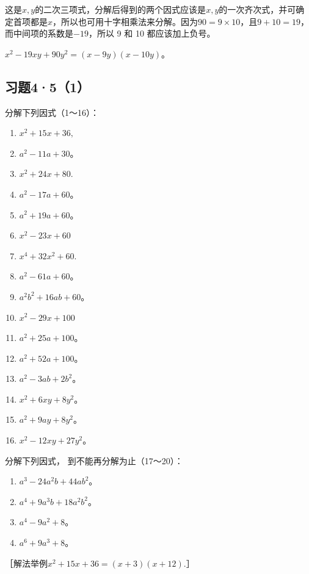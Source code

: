 这是\(x, y\)的二次三项式，分解后得到的两个因式应该是\(x, y\)的一次齐次式，并可确定首项都是\(x\)，所以也可用十字相乘法来分解。因为\(90 = 9 \times 10\)，且\(9 + 10 = 19\)，而中间项的系数是\(-19\)，所以
9 和 10 都应该加上负号。

\(x^{2} - 19xy + 90y^{2} = (x - 9y)(x - 10y)\)。

\subsection{习题4·5（1）}

分解下列因式（1～16）：

\begin{enumerate}[start=1]
\item
  \(x^{2} + 15x + 36,\)
\item
  \(a^2 - 11a + 30\)。
\item
  \(x^{2} + 24x + 80.\)
\item
  \(a^2 - 17a + 60\)。
\item
  \(a^2 + 19a + 60\)。
\item
  \(x^{2} - 23x + 60\)
\item
  \(x^{4} + 32x^{2} + 60.\)
\item
  \(a^2 - 61a + 60\)。
\item
  \(a^2 b^2 + 16ab + 60\)。
\item
  \(x^{2} - 29x + 100\)
\item
  \(a^2 + 25a + 100\)。
\item
  \(a^2 + 52a + 100\)。
\item
  \(a^2 - 3ab + 2b^2\)。
\item
  \(x^{2} + 6xy + 8y^{2}\)。
\item
  \(a^2 + 9ay + 8y^2\)。
\item
  \(x^{2} - 12xy + 27y^{2}\)。
\end{enumerate}

分解下列因式， 到不能再分解为止（17～20）：

\begin{enumerate}[start=17]
\item
  \(a^3 - 24a^2b + 44ab^2\)。
\item
  \(a^4 + 9a^3b + 18a^2b^2\)。
\item
  \(a^4 - 9a^2 + 8\)。
\item
  \(a^6 + 9a^3 + 8\)。
\end{enumerate}

［解法举例\(x^{2} + 15x + 36 = (x + 3)(x + 12)\).］

